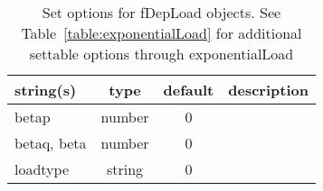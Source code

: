 \begin{table}[ht]
\centering
\begin{tabular}{p{5cm} c c p{7cm}}
\hline
string(s) & type & default & description \\
\hline
betap & number & 0 & \\
betaq, beta & number & 0 & \\
loadtype & string & 0 & \\
\hline
\end{tabular}
\caption{Set options for fDepLoad objects. See Table~\ref{table:exponentialLoad} for additional settable options through exponentialLoad}
\label{table:fDepLoad}
\end{table}
